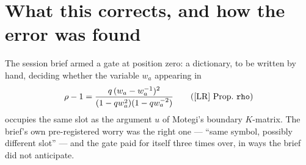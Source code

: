 \documentclass[11pt]{article}
\theoremstyle{plain}
\theoremstyle{definition}
\theoremstyle{remark}
\theoremstyle{plain}
\newcommand{\bI}{\mathbf{I}}
\newcommand{\bM}{\mathbf{M}}
\newcommand{\bw}{\mathbf{w}}
\newcommand{\At}{\widetilde{A}}
\newcommand{\ord}{\operatorname{ord}}
\begin{document}
\begin{abstract}
On the primary target, Gap \texttt{nonvanH} ($\ord_{H_{ab}}\At_{\bM,\bI}=0$ when
$\bM\ge\bI$ and $\{a,b\}\cap\bM=\emptyset$), I report a reduction and two failed
attempts with their breakdown points.  The reduction
(Proposition~\ref{prop:q0}) is that it suffices to prove the statement at
$q=0$, because $\At_{\bM,\bI}$ is regular at $q=0$ and $\mathcal{E}^C|_{q=0}=1$;
and that at $q=0$ the entire dependence of $\At_{\bM,\bI}$ on the variables
outside $\bw_{\bM}$ is the single product $\prod_{j\le r}\prod_{k<i_j}(u_j-w_k)$,
so that $w_k$ is absent whenever $k\ge\max\bI$.  This closes the gap on
the stratum $\max\bI\le b$ --- $100\%$, $91.7\%$, $81.9\%$, $72.8\%$, $64.8\%$,
$58.0\%$, $52.3\%$ of the domain at $N=2,\dots,8$, \emph{decreasing} --- modulo
nonvanishing of $\At_{\bM,\bI}$ at $q=0$, which is a factorial $GQ$-function
statement and is \emph{stronger} than the converse of triangularity that
[Q488] already carries as measured.  I say so rather than calling it a closure.
The two failed attempts are recorded in \S\ref{sec:failed}: a bidegree-corner
argument, \emph{refuted by measurement} (the corner is empty in $12/12$ cases at
$N=3$), and its $q=0$ refinement, which reduces to a symmetrisation sum twisted
by a non-symmetric monomial that I cannot evaluate.  Gap \texttt{nonvanH}
remains open.

Everything [LR] states for type $C$ is untouched: $\mathcal{E}^C$ is the correct
normaliser for type $C$ and is checked against Motegi's independent diagonal
root-product formula.
\end{abstract}

\tableofcontents

\section{What this corrects, and how the error was found}
\label{sec:intro}

The session brief armed a gate at position zero: a dictionary, to be written by
hand, deciding whether the variable $w_a$ appearing in
\[
  \rho-1=\frac{q\,(w_a-w_a^{-1})^2}{(1-qw_a^2)(1-qw_a^{-2})}
  \tag{[LR] Prop.\ \texttt{rho}}
\]
occupies the same slot as the argument $u$ of Motegi's boundary $K$-matrix.  The
brief's own pre-registered worry was the right one --- ``same symbol, possibly
different slot'' --- and the gate paid for itself three times over, in ways the
brief did not anticipate.
\end{document}
